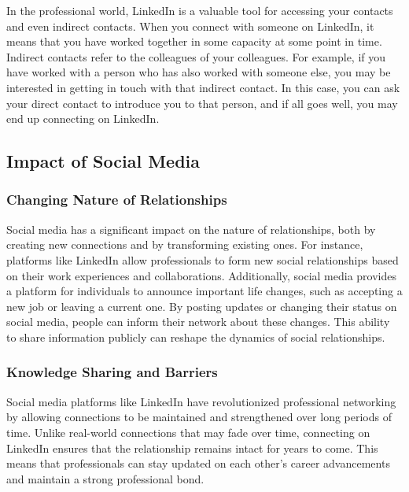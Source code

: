 In the professional world, LinkedIn is a valuable tool for accessing
your contacts and even indirect contacts. When you connect with someone
on LinkedIn, it means that you have worked together in some capacity at
some point in time. Indirect contacts refer to the colleagues of your
colleagues. For example, if you have worked with a person who has also
worked with someone else, you may be interested in getting in touch with
that indirect contact. In this case, you can ask your direct contact to
introduce you to that person, and if all goes well, you may end up
connecting on LinkedIn.

\subsection{Impact of Social Media}\label{impact-of-social-media}

\subsubsection{Changing Nature of
    Relationships}\label{changing-nature-of-relationships}

Social media has a significant impact on the nature of relationships,
both by creating new connections and by transforming existing ones. For
instance, platforms like LinkedIn allow professionals to form new social
relationships based on their work experiences and collaborations.
Additionally, social media provides a platform for individuals to
announce important life changes, such as accepting a new job or leaving
a current one. By posting updates or changing their status on social
media, people can inform their network about these changes. This ability
to share information publicly can reshape the dynamics of social
relationships.

\subsubsection{Knowledge Sharing and
    Barriers}\label{knowledge-sharing-and-barriers}

Social media platforms like LinkedIn have revolutionized professional
networking by allowing connections to be maintained and strengthened
over long periods of time. Unlike real-world connections that may fade
over time, connecting on LinkedIn ensures that the relationship remains
intact for years to come. This means that professionals can stay updated
on each other's career advancements and maintain a strong professional
bond.

